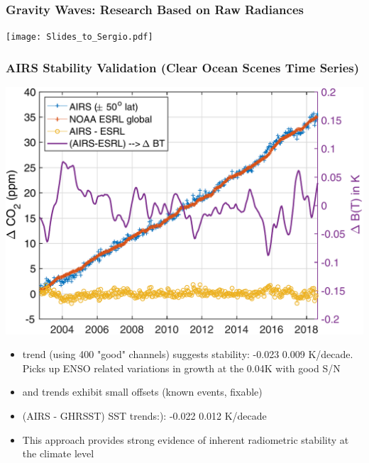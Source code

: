 \documentclass[10pt,t]{beamer}
\begin{document}
\begin{frame}
\frametitle{Gravity Waves: Research Based on Raw Radiances}  
\vspace{-0.35in}
\begin{center}
\texttt{[image: Slides\_to\_Sergio.pdf]}
\end{center}
\end{frame}
\begin{frame}
\frametitle{AIRS Stability Validation (Clear Ocean Scenes Time Series)}  
\vspace{-0.1in}
\begin{center}
\includegraphics[width=0.65\linewidth]{SunClimate2022/fig10.pdf}
\end{center}

\vspace{-0.05in}
\footnotesize
\begin{itemize}
\item \cd trend (using 400 "good" channels) suggests stability:  -0.023 \textpm{} 0.009 K/decade.  Picks up ENSO related variations in \cd growth at the 0.04K with good S/N
\item \methane and \nitrous trends exhibit small offsets (known events, fixable)
\item (AIRS - GHRSST) SST trends:):  -0.022 \textpm{} 0.012 K/decade
\item This approach provides strong evidence of inherent radiometric stability at the climate level
\end{itemize}
\end{frame}
\end{document}
